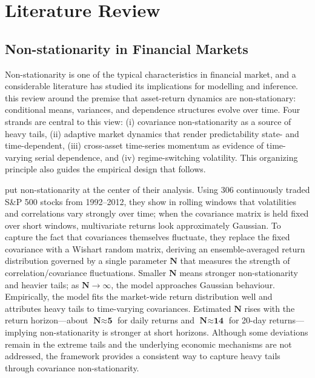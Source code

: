 \chapter{Literature Review} \label{Chapter: Conclusions}
\section{Non-stationarity in Financial Markets}

Non-stationarity is one of the typical characteristics in financial market, and a considerable literature has studied its implications for modelling and inference.  this review around the premise that asset-return dynamics are non-stationary: conditional means, variances, and dependence structures evolve over time. Four strands are central to this view: (i) covariance non-stationarity as a source of heavy tails, (ii) adaptive market dynamics that render predictability state- and time-dependent, (iii) cross-asset time-series momentum as evidence of time-varying serial dependence, and (iv) regime-switching volatility. This organizing principle also guides the empirical design that follows.

\cite{Schmitt_2013} put non-stationarity at the center of their analysis. Using 306 continuously traded S\&P 500 stocks from 1992–2012, they show in rolling windows that volatilities and correlations vary strongly over time; when the covariance matrix is held fixed over short windows, multivariate returns look approximately Gaussian. To capture the fact that covariances themselves fluctuate, they replace the fixed covariance with a Wishart random matrix, deriving an ensemble-averaged return distribution governed by a single parameter $\textbf{N}$ that measures the strength of correlation/covariance fluctuations. Smaller $\textbf{N}$ means stronger non-stationarity and heavier tails; as $\textbf{N} \rightarrow \infty$, the model approaches Gaussian behaviour. Empirically, the model fits the market-wide return distribution well and attributes heavy tails to time-varying covariances. Estimated $\textbf{N}$ rises with the return horizon—about $\textbf{N} \approx \textbf{5}$ for daily returns and $\textbf{N} \approx \textbf{14}$ for 20-day returns—implying non-stationarity is stronger at short horizons. Although some deviations remain in the extreme tails and the underlying economic mechanisms are not addressed, the framework provides a consistent way to capture heavy tails through covariance non-stationarity.

